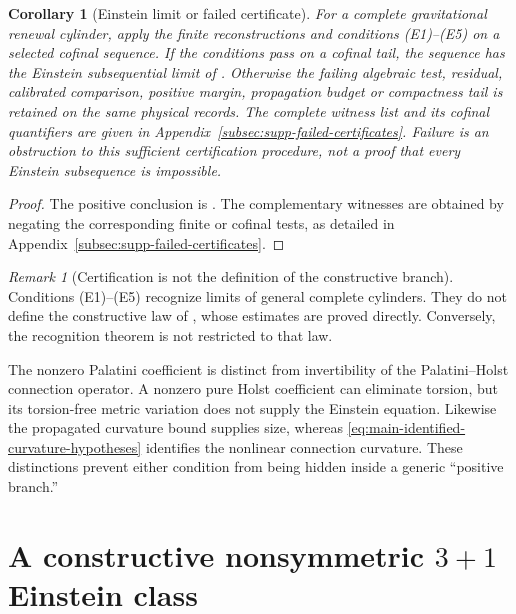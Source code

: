 \documentclass[11pt]{article}
\numberwithin{equation}{section}
\newtheorem{corollary}[corollary]{Corollary}
\theoremstyle{definition}
\theoremstyle{remark}
\newtheorem{remark}[remark]{Remark}
\begin{document}
\begin{corollary}[Einstein limit or failed certificate]
\label{thm:main-einstein-alternative}
For a complete gravitational renewal cylinder, apply the finite
reconstructions and conditions \textup{(E1)--(E5)} on a selected cofinal
sequence. If the conditions pass on a cofinal tail, the sequence has the
Einstein subsequential limit of .
Otherwise the failing algebraic test, residual, calibrated comparison,
positive margin, propagation budget or compactness tail is retained on
the same physical records. The complete witness list and its cofinal
quantifiers are given in Appendix~\ref{subsec:supp-failed-certificates}.
Failure is an obstruction to this sufficient certification procedure,
not a proof that every Einstein subsequence is impossible.
\end{corollary}
\begin{proof}
The positive conclusion is .
The complementary witnesses are obtained by negating the corresponding
finite or cofinal tests, as detailed in
Appendix~\ref{subsec:supp-failed-certificates}.
\end{proof}

\begin{remark}[Certification is not the definition of the constructive branch]
\label{rem:main-certification-not-tautology}
Conditions \textup{(E1)--(E5)} recognize limits of general complete
cylinders. They do not define the constructive law of
, whose estimates are proved directly. Conversely,
the recognition theorem is not restricted to that law.
\end{remark}

The nonzero Palatini coefficient is distinct from invertibility of the
Palatini--Holst connection operator.  A nonzero pure Holst coefficient can
eliminate torsion, but its torsion-free metric variation does not supply the
Einstein equation.  Likewise the propagated curvature bound supplies size,
whereas \eqref{eq:main-identified-curvature-hypotheses} identifies the nonlinear
connection curvature.  These distinctions prevent either condition from being
hidden inside a generic ``positive branch.''


\section{A constructive nonsymmetric \texorpdfstring{$3+1$}{3+1} Einstein class}
\label{sec:constructive-main}
\end{document}

